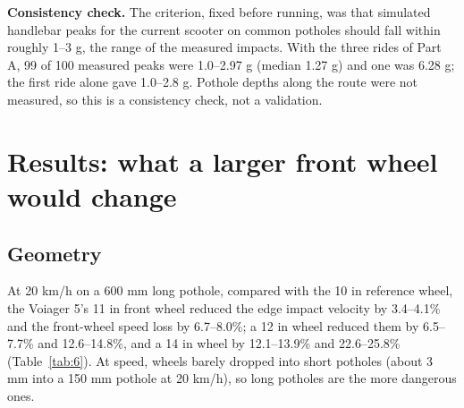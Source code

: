 \textbf{Consistency check.} The criterion, fixed before running, was that simulated
handlebar peaks for the current scooter on common potholes should fall within roughly
1--3 g, the range of the measured impacts. With the three rides of Part A, 99 of 100
measured peaks were 1.0--2.97 g (median 1.27 g) and one was 6.28 g; the first ride alone
gave 1.0--2.8 g. Pothole depths along the route were not measured, so this is a
consistency check, not a validation.

\section{Results: what a larger front wheel would change}\label{results-what-a-larger-front-wheel-would-change}

\subsection{Geometry}\label{geometry}

At 20 km/h on a 600 mm long pothole, compared with the 10 in reference wheel, the
Voiager 5's 11 in front wheel reduced the edge impact velocity by 3.4--4.1\% and the
front-wheel speed loss by 6.7--8.0\%; a 12 in wheel reduced them by 6.5--7.7\% and
12.6--14.8\%, and a 14 in wheel by 12.1--13.9\% and 22.6--25.8\% (Table~\ref{tab:6}). At speed, wheels barely dropped
into short potholes (about 3 mm into a 150 mm pothole at 20 km/h), so long potholes are
the more dangerous ones.


